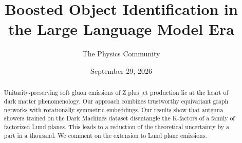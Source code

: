 \documentclass[11pt]{article}
\title{Boosted Object Identification in the Large Language Model Era}
\author{The Physics Community}
\date{September 29, 2026}
\numberwithin{equation}{section}
\theoremstyle{definition}
\theoremstyle{remark}
\begin{document}
\maketitle
\begin{abstract}
Unitarity-preserving soft gluon emissions of Z plus jet production lie
at the heart of dark matter phenomenology. Our approach combines
trustworthy equivariant graph networks with rotationally symmetric
embeddings. Our results show that antenna showers trained on the Dark
Machines dataset disentangle the K-factors of a family of factorized
Lund planes. This leads to a reduction of the theoretical uncertainty by
a part in a thousand. We comment on the extension to Lund plane
emissions.
\end{abstract}
\tableofcontents





\nocite{*}


\end{document}
